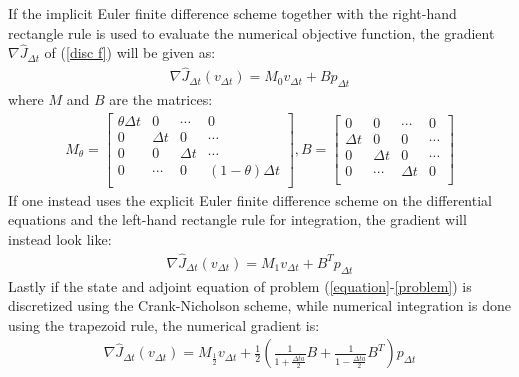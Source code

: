 \begin{theorem} \label{Theorem_num_grad}
If the implicit Euler finite difference scheme together with the right-hand rectangle rule is used to evaluate the numerical objective function, the gradient $\nabla \hat J_{\Delta t}$ of (\ref{disc f}) will be given as:
\begin{align}
\nabla \hat J_{\Delta t}(v_{\Delta t}) = M_0v_{\Delta t} + Bp_{\Delta t} \label{num_grad}
\end{align}
where $M$ and $B$ are the matrices:
\begin{align*}
M_{\theta}=\left[ \begin{array}{cccc}
   \theta\Delta t & 0 & \cdots & 0 \\  
   0& \Delta t & 0 & \cdots \\ 
   0 &0 & \Delta t  & \cdots \\
   0 &\cdots &0 & (1-\theta)\Delta t   \\
   \end{array}  \right] 
,B = \left[ \begin{array}{cccc}
   0& 0 & \cdots & 0 \\  
   \Delta t& 0 & 0 & \cdots \\ 
   0 & \Delta t& 0  & \cdots \\
   0 &\cdots & \Delta t& 0   \\
   \end{array}  \right] 
\end{align*}
If one instead uses the explicit Euler finite difference scheme on the differential equations and the left-hand rectangle rule for integration, the gradient will instead look like:
\begin{align*}
\nabla \hat J_{\Delta t}(v_{\Delta t}) = M_1v_{\Delta t} + B^Tp_{\Delta t}
\end{align*}
Lastly if the state and adjoint equation of problem (\ref{equation}-\ref{problem}) is discretized using the Crank-Nicholson scheme, while numerical integration is done using the trapezoid rule, the numerical gradient is:
\begin{align*}
\nabla \hat J_{\Delta t}(v_{\Delta t}) = M_{\frac{1}{2}}v_{\Delta t} + \frac{1}{2}( \frac{1}{1+\frac{\Delta t a}{2}} B+\frac{1}{1-\frac{\Delta t a}{2}}B^T)p_{\Delta t}
\end{align*}
\end{theorem}

